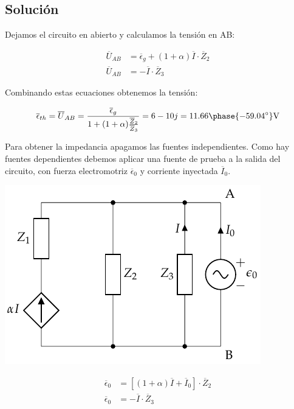 \subsection*{Solución}

Dejamos el circuito en abierto y calculamos la tensión en AB:

\begin{align*}
  \overline{U}_{AB} &= \overline{\epsilon}_g + (1 + \alpha) \overline{I} \cdot \overline{Z}_2\\
  \overline{U}_{AB} &= - \overline{I} \cdot \overline{Z}_3
\end{align*}

Combinando estas ecuaciones obtenemos la tensión:

\begin{equation*}
  \overline{\epsilon}_{th} = \overline{U}_{AB} = \frac{\overline{\epsilon}_g}{1 + (1 + \alpha) \frac{\overline{Z}_2}{\overline{Z}_3}} = 6 - 10j = 11.66\phase{\ang{-59.04}}\si{\volt}
\end{equation*}

Para obtener la impedancia apagamos las fuentes independientes. Como hay fuentes dependientes debemos aplicar una fuente de prueba a la salida del circuito, con fuerza electromotriz $\overline{\epsilon}_0$ y corriente inyectada $\overline{I}_0$.

\begin{minipage}{0.5\linewidth}
  \begin{center}
    \includegraphics{figuras/Thevenin4_fuenteprueba}
  \end{center}
\end{minipage}
\begin{minipage}{0.5\linewidth}
  \begin{align*}
    \overline{\epsilon}_0 &= [(1 + \alpha) \overline{I} + \overline{I}_0] \cdot \overline{Z}_2\\
    \overline{\epsilon}_0 &= - \overline{I}\cdot \overline{Z}_3
  \end{align*}
\end{minipage}

